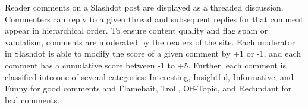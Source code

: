 Reader comments on a Slashdot post are displayed as a threaded discussion. Commenters can reply to a given thread and subsequent replies for that comment appear in hierarchical order. To ensure content quality and flag spam or vandalism, comments are moderated by the readers of the site. Each moderator in Slashdot is able to modify the score of a given comment by +1 or -1, and each comment has a cumulative score between -1 to +5. Further, each comment is classified into one of several categories: Interesting, Insightful, Informative, and Funny for good comments and Flamebait, Troll, Off-Topic, and Redundant for bad comments.



